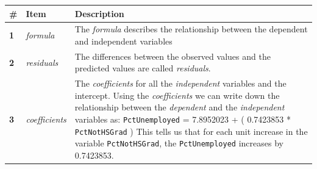 \documentclass[]{article}
\begin{document}
\begin{longtable}[]{@{}lll@{}}
\toprule
\begin{minipage}[b]{0.07\columnwidth}\raggedright
\#\strut
\end{minipage} & \begin{minipage}[b]{0.21\columnwidth}\raggedright
Item\strut
\end{minipage} & \begin{minipage}[b]{0.63\columnwidth}\raggedright
Description\strut
\end{minipage}\tabularnewline
\midrule
\endhead
\begin{minipage}[t]{0.07\columnwidth}\raggedright
\textbf{1}\strut
\end{minipage} & \begin{minipage}[t]{0.21\columnwidth}\raggedright
\emph{formula}\strut
\end{minipage} & \begin{minipage}[t]{0.63\columnwidth}\raggedright
The \emph{formula} describes the relationship between the dependent and independent variables\strut
\end{minipage}\tabularnewline
\begin{minipage}[t]{0.07\columnwidth}\raggedright
\textbf{2}\strut
\end{minipage} & \begin{minipage}[t]{0.21\columnwidth}\raggedright
\emph{residuals}\strut
\end{minipage} & \begin{minipage}[t]{0.63\columnwidth}\raggedright
The differences between the observed values and the predicted values are called \emph{residuals}.\strut
\end{minipage}\tabularnewline
\begin{minipage}[t]{0.07\columnwidth}\raggedright
\textbf{3}\strut
\end{minipage} & \begin{minipage}[t]{0.21\columnwidth}\raggedright
\emph{coefficients}\strut
\end{minipage} & \begin{minipage}[t]{0.63\columnwidth}\raggedright
The \emph{coefficients} for all the \emph{independent} variables and the intercept. Using the \emph{coefficients} we can write down the relationship between the \emph{dependent} and the \emph{independent} variables as: \texttt{PctUnemployed} = 7.8952023 + ( 0.7423853 * \texttt{PctNotHSGrad} ) This tells us that for each unit increase in the variable \texttt{PctNotHSGrad}, the \texttt{PctUnemployed} increases by 0.7423853.\strut

\end{minipage}
\end{longtable}
\end{document}
